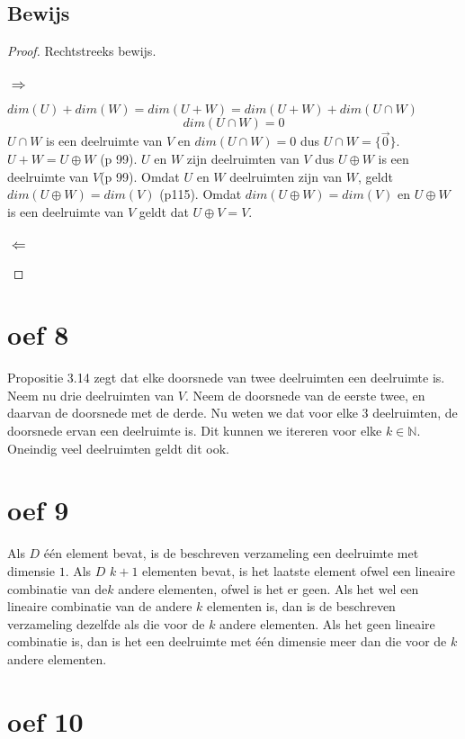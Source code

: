 \documentclass[lineaire_algebra_oplossingen.tex]{subfiles}
\begin{document}
\subsection*{Bewijs}
\begin{proof}
Rechtstreeks bewijs.
\subsubsection*{$\Rightarrow$}
$dim(U) + dim(W) = dim(U+W)= dim(U+W) + dim(U\cap W)$
\[
dim(U\cap W) = 0
\]
$U \cap W$ is een deelruimte van $V$ en $dim(U\cap W) = 0$ dus $U \cap W = \{\vec{0}\}$.
$U+W = U\oplus W$ (p 99). $U$ en $W$ zijn deelruimten van $V$ dus $U\oplus W$ is een deelruimte van $V$(p 99). Omdat $U$ en $W$ deelruimten zijn van $W$, geldt $dim(U \oplus W) = dim(V)$ (p115). Omdat $dim(U \oplus W) = dim(V)$ en $U \oplus W$ is een deelruimte van $V$ geldt dat $U \oplus V = V$.
\subsubsection*{$\Leftarrow$}
\end{proof}

\section{oef 8}
Propositie 3.14 zegt dat elke doorsnede van twee deelruimten een deelruimte is. Neem nu drie deelruimten van $V$. Neem de doorsnede van de eerste twee, en daarvan de doorsnede met de derde. Nu weten we dat voor elke $3$ deelruimten, de doorsnede ervan een deelruimte is. Dit kunnen we itereren voor elke $k \in \mathbb{N}$. Oneindig veel deelruimten geldt dit ook.

\section{oef 9}
Als $D$ één element bevat, is de beschreven verzameling een deelruimte met dimensie $1$. Als $D$ $k+1$ elementen bevat, is het laatste element ofwel een lineaire combinatie van de$k$ andere elementen, ofwel is het er geen. Als het wel een lineaire combinatie van de andere $k$ elementen is, dan is de beschreven verzameling dezelfde als die voor de $k$ andere elementen. Als het geen lineaire combinatie is, dan is het een deelruimte met één dimensie meer dan die voor de $k$ andere elementen.
\section{oef 10}
\end{document}

